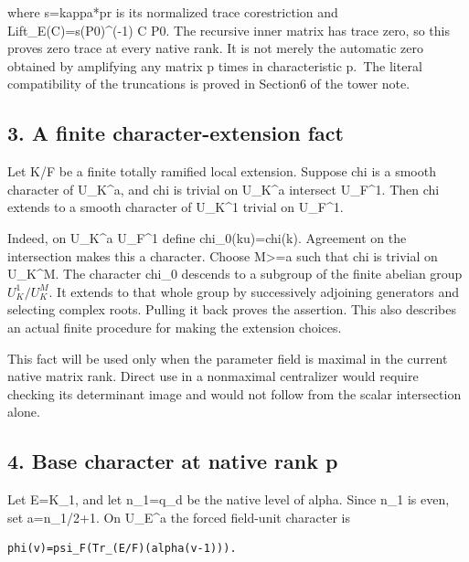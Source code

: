 where s=kappa*pr is its normalized trace corestriction and
Lift\_E(C)=s(P0)\^{}(-1) C P0. The recursive inner matrix has trace
zero, so this proves zero trace at every native rank. It is not merely
the automatic zero obtained by amplifying any matrix p times in
characteristic p.~The literal compatibility of the truncations is proved
in Section6 of the tower note.

\hypertarget{odd_character-a-finite-character-extension-fact}{%
\subsection{3. A finite character-extension
fact}\label{odd_character-a-finite-character-extension-fact}}

Let K/F be a finite totally ramified local extension. Suppose chi is a
smooth character of U\_K\^{}a, and chi is trivial on U\_K\^{}a intersect
U\_F\^{}1. Then chi extends to a smooth character of U\_K\^{}1 trivial
on U\_F\^{}1.

Indeed, on U\_K\^{}a U\_F\^{}1 define chi\_0(ku)=chi(k). Agreement on
the intersection makes this a character. Choose M\textgreater=a such
that chi is trivial on U\_K\^{}M. The character chi\_0 descends to a
subgroup of the finite abelian group \(U_K^1/U_K^M\). It
extends to that whole group by successively adjoining generators and
selecting complex roots. Pulling it back proves the assertion. This also
describes an actual finite procedure for making the extension choices.

This fact will be used only when the parameter field is maximal in the
current native matrix rank. Direct use in a nonmaximal centralizer would
require checking its determinant image and would not follow from the
scalar intersection alone.

\hypertarget{odd_character-base-character-at-native-rank-p}{%
\subsection{4. Base character at native rank
p}\label{odd_character-base-character-at-native-rank-p}}

Let E=K\_1, and let n\_1=q\_d be the native level of alpha. Since n\_1
is even, set a=n\_1/2+1. On U\_E\^{}a the forced field-unit character is

\begin{Verbatim}[fontsize=\small,breaklines=true,breakanywhere=true]
phi(v)=psi_F(Tr_(E/F)(alpha(v-1))).
\end{Verbatim}

